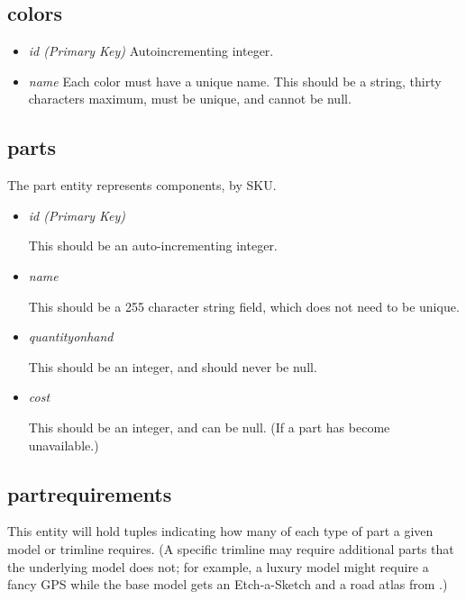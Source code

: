 \documentclass[11pt,letterpaper,oneside]{amsart}
\begin{document}
\subsection*{colors}

\begin{itemize}
	\item \emph{id (Primary Key)}
		Autoincrementing integer.

	\item \emph	{name}
		Each color must have a unique name.  This should be a string, thirty characters maximum, must be unique, and cannot be null.
		
\end{itemize}

\subsection*{parts}

The part entity represents components, by SKU.

\begin{itemize}

\item \emph{id (Primary Key)}

	This should be an auto-incrementing integer.
	
\item \emph{name}

	This should be a 255 character string field, which does not need to be unique.
	
\item \emph{quantity{\textunderscore}on{\textunderscore}hand}

	This should be an integer, and should never be null.
	
\item \emph{cost}

	This should be an integer, and can be null. (If a part has become unavailable.)
	
\end{itemize}

\subsection*{part{\textunderscore}requirements}

This entity will hold tuples indicating how many of each type of part a given model or trimline requires.  (A specific trimline may require additional parts that the underlying model does not; for example, a luxury model might require a fancy GPS while the base model gets an Etch-a-Sketch and a road atlas from .)
\end{document}
